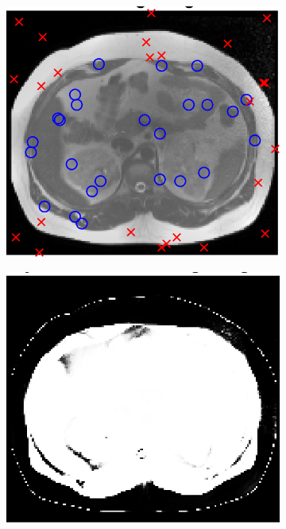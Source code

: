 \documentclass[10pt,twoside]{book}
\begin{document}
\begin{figure}
  \centering
  \begin{subfigure}{0.3\textwidth}
    \centering
    \includegraphics[width=\textwidth]{scenario1_training_sampleLocations}
    \caption{}
    \label{fig:logisticRegressionImageClassification_a}
  \end{subfigure}
  \begin{subfigure}{0.3\textwidth}
    \centering
    \includegraphics[width=\textwidth]{scenario1_training_posteriorImage}

\end{subfigure}
\end{figure}
\end{document}
